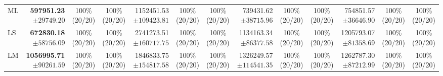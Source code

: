 \begin{table}[!t]
\begin{tabular}{@{}l*{4}{rcc}@{}}
ML & \shortstack[r]{\textbf{597951.23}\\$\pm 29749.20$} & \shortstack[c]{100\%\\(20/20)} & \shortstack[c]{100\%\\(20/20)} & \shortstack[r]{1152451.53\\$\pm 109423.81$} & \shortstack[c]{100\%\\(20/20)} & \shortstack[c]{100\%\\(20/20)} & \shortstack[r]{739431.62\\$\pm 38715.96$} & \shortstack[c]{100\%\\(20/20)} & \shortstack[c]{100\%\\(20/20)} & \shortstack[r]{754851.57\\$\pm 36646.90$} & \shortstack[c]{100\%\\(20/20)} & \shortstack[c]{100\%\\(20/20)} \\
LS & \shortstack[r]{\textbf{672830.18}\\$\pm 58756.09$} & \shortstack[c]{100\%\\(20/20)} & \shortstack[c]{100\%\\(20/20)} & \shortstack[r]{2741273.51\\$\pm 160717.75$} & \shortstack[c]{100\%\\(20/20)} & \shortstack[c]{100\%\\(20/20)} & \shortstack[r]{1134163.34\\$\pm 86377.58$} & \shortstack[c]{100\%\\(20/20)} & \shortstack[c]{100\%\\(20/20)} & \shortstack[r]{1205793.07\\$\pm 81358.69$} & \shortstack[c]{100\%\\(20/20)} & \shortstack[c]{100\%\\(20/20)} \\
LM & \shortstack[r]{\textbf{1056995.71}\\$\pm 90261.59$} & \shortstack[c]{100\%\\(20/20)} & \shortstack[c]{100\%\\(20/20)} & \shortstack[r]{1846833.75\\$\pm 154817.58$} & \shortstack[c]{100\%\\(20/20)} & \shortstack[c]{100\%\\(20/20)} & \shortstack[r]{1326249.57\\$\pm 114541.35$} & \shortstack[c]{100\%\\(20/20)} & \shortstack[c]{100\%\\(20/20)} & \shortstack[r]{1262787.30\\$\pm 87212.99$} & \shortstack[c]{100\%\\(20/20)} & \shortstack[c]{100\%\\(20/20)} \\

\end{tabular}
\end{table}
